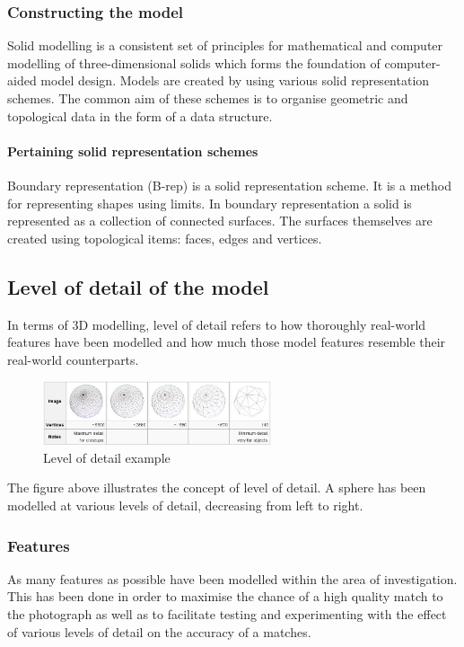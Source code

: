 \documentclass[11pt,a4paper]{report}
\begin{document}
			\subsubsection{Constructing the model}
				Solid modelling is a consistent set of principles for mathematical and computer modelling of three-dimensional solids which forms the foundation of computer-aided model design. 
				\cite{vadim_shapiro_solid_2001}
				Models are created by using various solid representation schemes. The common aim of these schemes is to organise geometric and topological data in the form of a data structure. 
				
				\paragraph{Pertaining solid representation schemes}
					Boundary representation (B-rep) is a solid representation scheme. It is a method for representing shapes using limits. In boundary representation a solid is represented as a collection of connected surfaces. The surfaces themselves are created using topological items: faces, edges and vertices.
					\cite{hongxin_zhang_introduction_2007}
				
		\subsection{Level of detail of the model}
			In terms of 3D modelling, level of detail refers to how thoroughly real-world features have been modelled and how much those model features resemble their real-world counterparts.
			
			\begin{figure}[h!]
				\centering
				\includegraphics[width=0.6\textwidth]{level_of_detail_example}
				\caption{Level of detail example}
			\end{figure}
			
			The figure above illustrates the concept of level of detail. A sphere has been modelled at various levels of detail, decreasing from left to right.
			
			\subsubsection{Features}
				As many features as possible have been modelled within the area of investigation. This has been done in order to maximise the chance of a high quality match to the photograph as well as to facilitate testing and experimenting with the effect of various levels of detail on the accuracy of a matches. 
				
\end{document}

